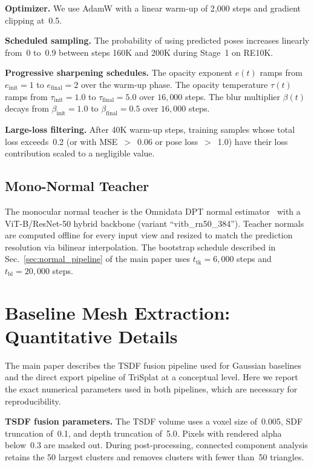 \documentclass{llmxive}
\providecommand{\method}{TriSplat\xspace}
\providecommand{\boldstart}[1]{\vspace{0.1in}\noindent\textbf{#1}}
\begin{document}
\boldstart{Optimizer.}
We use AdamW with a linear warm-up of 2{,}000 steps and gradient clipping at~0.5.

\boldstart{Scheduled sampling.}
The probability of using predicted poses increases linearly from~0 to~0.9 between steps 160K and 200K during Stage~1 on RE10K.

\boldstart{Progressive sharpening schedules.}
The opacity exponent $e(t)$ ramps from $e_{\mathrm{init}} = 1$ to $e_{\mathrm{final}} = 2$ over the warm-up phase. The opacity temperature $\tau(t)$ ramps from $\tau_{\mathrm{init}} = 1.0$ to $\tau_{\mathrm{final}} = 5.0$ over $16{,}000$ steps. The blur multiplier $\beta(t)$ decays from $\beta_{\mathrm{init}} = 1.0$ to $\beta_{\mathrm{final}} = 0.5$ over $16{,}000$ steps.

\boldstart{Large-loss filtering.}
After 40K warm-up steps, training samples whose total loss exceeds~0.2 (or with MSE~$>$~0.06 or pose loss~$>$~1.0) have their loss contribution scaled to a negligible value.

\subsection{Mono-Normal Teacher}
\label{sec:app_mono_teacher}

The monocular normal teacher is the Omnidata DPT normal estimator~\citep{eftekhar2021omnidata} with a ViT-B/ResNet-50 hybrid backbone (variant ``vitb\_rn50\_384''). Teacher normals are computed offline for every input view and resized to match the prediction resolution via bilinear interpolation. The bootstrap schedule described in Sec.~\ref{sec:normal_pipeline} of the main paper uses $t_{\mathrm{tk}} = 6{,}000$ steps and $t_{\mathrm{bl}} = 20{,}000$ steps.

\section{Baseline Mesh Extraction: Quantitative Details}
\label{sec:app_baseline_mesh}

The main paper describes the TSDF fusion pipeline used for Gaussian baselines and the direct export pipeline of \method at a conceptual level. Here we report the exact numerical parameters used in both pipelines, which are necessary for reproducibility.

\boldstart{TSDF fusion parameters.}
The TSDF volume uses a voxel size of~0.005, SDF truncation of~0.1, and depth truncation of~5.0. Pixels with rendered alpha below~0.3 are masked out. During post-processing, connected component analysis retains the 50 largest clusters and removes clusters with fewer than~50 triangles.
\end{document}
